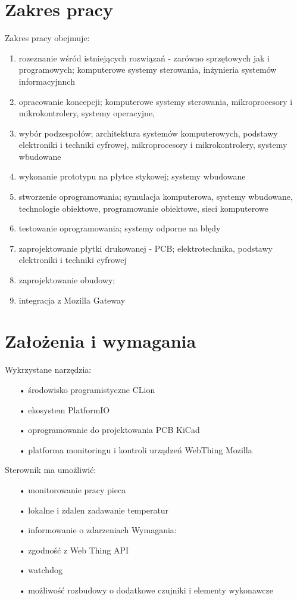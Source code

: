 \documentclass[11pt,a4paper]{report}
\begin{document}
 \section{Zakres pracy}
 Zakres pracy obejmuje:
 \begin{enumerate}
 \item rozeznanie wśród istniejących rozwiązań - zarówno sprzętowych jak i programowych; komputerowe systemy sterowania, inżynieria systemów informacyjnnch
 \item opracowanie koncepcji; komputerowe systemy sterowania, mikroprocesory i mikrokontrolery, systemy operacyjne, 
 \item wybór podzespołów; architektura systemów komputerowych, podstawy elektroniki i techniki cyfrowej, mikroprocesory i mikrokontrolery, systemy wbudowane
 \item wykonanie prototypu na płytce stykowej; systemy wbudowane
 \item stworzenie oprogramowania; symulacja komputerowa, systemy wbudowane, technologie obiektowe, programowanie obiektowe, sieci komputerowe
 \item testowanie oprogramowania; systemy odporne na błędy
 \item zaprojektowanie płytki drukowanej - PCB; elektrotechnika, podstawy elektroniki i techniki cyfrowej
 \item zaprojektowanie obudowy; 
 \item integracja z Mozilla Gateway
 \end{enumerate}
 
 \section{Założenia i wymagania}
 
 Wykrzystane narzędzia:
 \begin{enumerate}
 \item[•] środowisko programistyczne CLion
 \item[•] ekosystem PlatformIO
 \item[•] oprogramowanie do projektowania PCB KiCad
 \item[•] platforma monitoringu i kontroli urządzeń WebThing Mozilla
 \end{enumerate}
 Sterownik ma umożliwić:
 \begin{enumerate}
 \item[•] monitorowanie pracy pieca
 \item[•] lokalne i zdalen zadawanie temperatur
 \item[•] informowanie o zdarzeniach
 Wymagania:
 \item[•] zgodność z Web Thing API
 \item[•] watchdog
 \item[•] możliwość rozbudowy o dodatkowe czujniki i elementy wykonawcze
 
  
 \end{enumerate}
 
\end{document}
